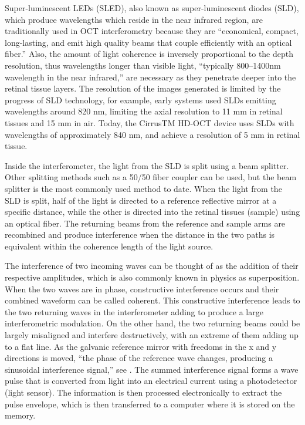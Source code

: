 Super-luminescent LEDs (SLED), also known as super-luminescent diodes (SLD),
which produce wavelengths which reside in the near infrared region, are
traditionally used in OCT interferometry because they are “economical,
compact, long-lasting, and emit high quality beams that couple efficiently
with an optical fiber.” \cite{mbib_6} Also, the amount of light coherence
is inversely proportional to the depth resolution, thus wavelengths longer
than visible light, “typically 800–1400nm wavelength in the near infrared,”
are necessary as they penetrate deeper into the retinal tissue layers.\cite{mbib_4,mbib_7}
The resolution of the images generated is limited by the progress of SLD
technology, for example, early systems used SLDs emitting wavelengths around
820 nm, limiting the axial resolution to 11 mm in retinal tissues and 15 mm
in air. \cite{mbib_6}  Today, the CirrusTM HD-OCT device uses SLDs with wavelengths
of approximately 840 nm, and achieve a resolution of 5 mm in retinal tissue. \cite{mbib_7}

Inside the interferometer, the light from the SLD is split using a beam splitter.
Other splitting methods such as a 50/50 fiber coupler can be used, but the beam
splitter is the most commonly used method to date.  When the light from the SLD
is split, half of the light is directed to a reference reflective mirror at a
specific distance, while the other is directed into the retinal tissues (sample)
using an optical fiber.  The returning beams from the reference and sample arms
are recombined and produce interference when the distance in the two paths is
equivalent within the coherence length of the light source. \cite{mbib_5,mbib_6}

The interference of two incoming waves can be thought of as the addition of their
respective amplitudes, which is also commonly known in physics as superposition.
When the two waves are in phase, constructive interference occurs and their combined
waveform can be called coherent.  This constructive interference leads to the two
returning waves in the interferometer adding to produce a large interferometric
modulation.  On the other hand, the two returning beams could be largely misaligned
and interfere destructively, with an extreme of them adding up to a flat line.
As the galvanic reference mirror with freedoms in the x and y directions is moved,
“the phase of the reference wave changes, producing a sinusoidal interference signal,”
see . The summed interference signal forms a wave pulse that is converted
from light into an electrical current using a photodetector (light sensor).\cite{mbib_6}
The information is then processed electronically to extract the pulse envelope, which
is then transferred to a computer where it is stored on the memory.\cite{mbib_6}

